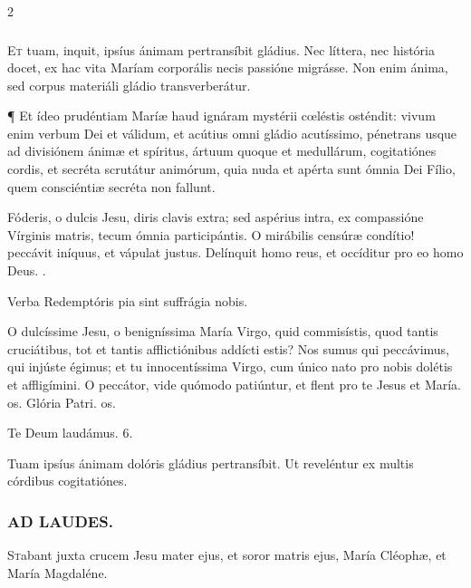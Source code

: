 \documentclass[9pt,twoside]{extarticle}
\begin{document}
\begin{multicols}{2}
\subsubsection*{\center {}}
\lettrine{E}t tuam, inquit, ipsíus ánimam pertransíbit gládius. Nec líttera, nec história docet, ex hac vita Maríam corporális necis passióne migrásse. Non enim ánima, sed corpus materiáli gládio transverberátur.

¶ Et ídeo prudéntiam Maríæ haud ignáram mystérii cœléstis osténdit: vivum enim verbum Dei et válidum, et acútius omni gládio acutíssimo, pénetrans usque ad divisiónem ánimæ et spíritus, ártuum quoque et medullárum, cogitatiónes cordis, et secréta scrutátur animórum, quia nuda et apérta sunt ómnia Dei Fílio, quem consciéntiæ secréta non fallunt.

\begin{tightlist}{}
\item {} Fóderis, o dulcis Jesu, diris clavis extra; sed aspérius intra, ex compassióne Vírginis matris, tecum ómnia participántis. \textred{*} O mirábilis censúræ condítio! peccávit iníquus, et vápulat justus.  Delínquit homo reus, et occíditur pro eo homo Deus. .
\item {}
\item {\small {} Verba Redemptóris pia sint suffrágia nobis.}
\item {} O dulcíssime Jesu, o benigníssima María Virgo, quid commisístis, quod tantis cruciátibus, tot et tantis afflictiónibus addícti estis? \textred{*} Nos sumus qui peccávimus, qui injúste égimus; et tu innocentíssima Virgo, cum único nato pro nobis dolétis et affligímini.  O peccátor, vide quómodo patiúntur, et flent pro te Jesus et María. os. Glória Patri. os.
\item Te Deum laudámus. 6.
\item {} Tuam ipsíus ánimam dolóris gládius pertransíbit.  Ut reveléntur ex multis córdibus cogitatiónes.
\end{tightlist}

\subsubsection*{\center \textsc{AD LAUDES.}}
\begin{center}\end{center}
\lettrine{S}tabant juxta crucem Jesu mater ejus, et soror matris ejus, María Cléophæ, et María Magdaléne.


\end{multicols}
\end{document}
